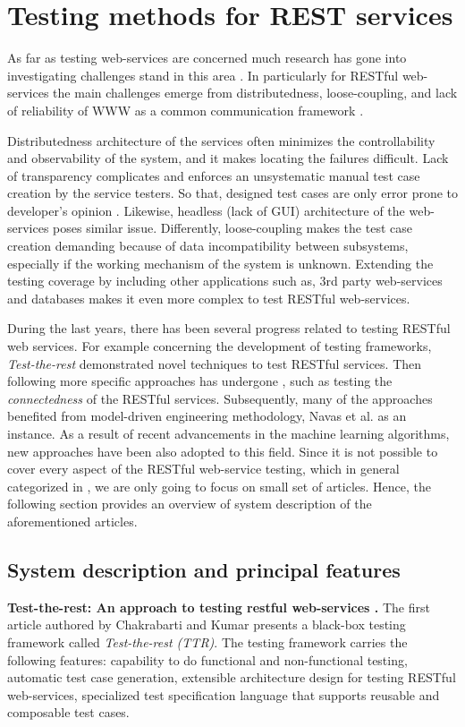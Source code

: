 \documentclass[english]{tktltiki}
\begin{document}
\section{Testing methods for REST services}
As far as testing web-services are concerned much research has gone into investigating challenges stand in this area \cite{canfora2009service, bozkurt2013testing}. In particularly for RESTful web-services the main challenges emerge from distributedness, loose-coupling, and lack of reliability of WWW as a common communication framework \cite{chakrabarti2009test}. 

Distributedness architecture of the services often minimizes the controllability and observability of the system, and it makes locating the failures difficult. Lack of transparency complicates and enforces an unsystematic manual test case creation by the service testers. So that, designed test cases are only error prone to developer's opinion \cite{navas2014rest}. Likewise, headless (lack of GUI) architecture of the web-services poses similar issue. Differently, loose-coupling makes the test case creation demanding because of data incompatibility between subsystems, especially if the working mechanism of the system is unknown. Extending the testing coverage by including other applications such as, 3rd party web-services and databases makes it even more complex to test RESTful web-services.

During the last years, there has been several progress related to testing RESTful web services. For example concerning the development of testing frameworks, \textit{Test-the-rest} \cite{chakrabarti2009test} demonstrated novel techniques to test RESTful services. Then following more specific approaches has undergone \cite{chakrabarti2010connectedness}, such as testing the \textit{connectedness} of the RESTful services. Subsequently, many of the approaches benefited from model-driven engineering methodology, Navas et al. \cite{navas2014rest} as an instance. As a result of recent advancements in the machine learning algorithms, new approaches \cite{navas2014rest, arcuri2017restful} have been also adopted to this field. Since it is not possible to cover every aspect of the RESTful web-service testing, which in general categorized in \cite{canfora2009service, bozkurt2013testing}, we are only going to focus on small set of articles. Hence, the following section provides an overview of system description of the aforementioned articles.

\subsection{System description and principal features}
\textbf{Test-the-rest: An approach to testing restful web-services \cite{chakrabarti2009test}.} The first article authored by Chakrabarti and Kumar \cite{chakrabarti2009test} presents a black-box testing framework called \textit{Test-the-rest (TTR)}. The testing framework carries the following features: capability to do functional and non-functional testing, automatic test case generation, extensible architecture design for testing RESTful web-services, specialized test specification language that supports reusable and composable test cases.
\end{document}
